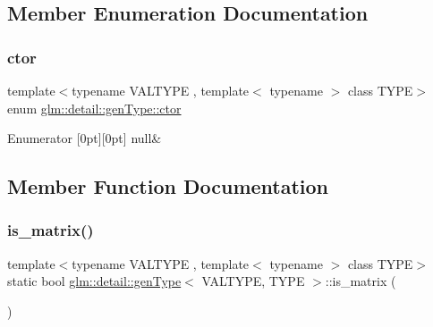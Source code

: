 \subsection{Member Enumeration Documentation}
\mbox{\label{structglm_1_1detail_1_1gen_type_a67fe8a1e8d43ab9e9151868ed277be94}} 
\subsubsection{\texorpdfstring{ctor}{ctor}}
{\footnotesize\ttfamily template$<$typename V\+A\+L\+T\+Y\+PE , template$<$ typename $>$ class T\+Y\+PE$>$ \\
enum \mbox{\hyperlink{structglm_1_1detail_1_1gen_type_a67fe8a1e8d43ab9e9151868ed277be94}{glm\+::detail\+::gen\+Type\+::ctor}}}

\begin{DoxyEnumFields}{Enumerator}
[0pt][0pt]{}\mbox{\label{structglm_1_1detail_1_1gen_type_a67fe8a1e8d43ab9e9151868ed277be94a95dbe65e3036a53702aa8c21f040d753}} 
null&\\
\hline

\end{DoxyEnumFields}


\subsection{Member Function Documentation}
\mbox{\label{structglm_1_1detail_1_1gen_type_a78c650375558d5e2ccfba383cdb59479}} 
\subsubsection{\texorpdfstring{is\+\_\+matrix()}{is\_matrix()}}
{\footnotesize\ttfamily template$<$typename V\+A\+L\+T\+Y\+PE , template$<$ typename $>$ class T\+Y\+PE$>$ \\
static bool \mbox{\hyperlink{structglm_1_1detail_1_1gen_type}{glm\+::detail\+::gen\+Type}}$<$ V\+A\+L\+T\+Y\+PE, T\+Y\+PE $>$\+::is\+\_\+matrix (\begin{DoxyParamCaption}{ }\end{DoxyParamCaption})\hspace{0.3cm}{\ttfamily [static]}}

